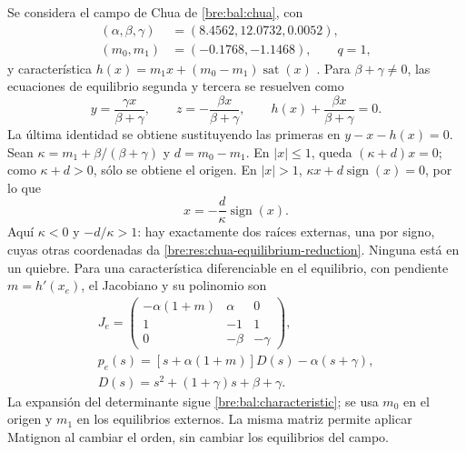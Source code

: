 Se considera el campo de Chua de \eqref{bre:bal:chua}, con
\[
 \begin{aligned}
 (\alpha,\beta,\gamma)&=(8.4562,12.0732,0.0052),\\
 (m_0,m_1)&=(-0.1768,-1.1468),\qquad q=1,
 \end{aligned}
\]
y característica \(h(x)=m_1x+(m_0-m_1)\operatorname{sat}(x)\)
\cite{LeonovKuznetsov2013}. Para \(\beta+\gamma\ne0\), las ecuaciones de
equilibrio segunda y tercera se resuelven como
\begin{equation}
 y=\frac{\gamma x}{\beta+\gamma},\qquad
 z=-\frac{\beta x}{\beta+\gamma},\qquad
 h(x)+\frac{\beta x}{\beta+\gamma}=0.
 \label{bre:res:chua-equilibrium-reduction}
\end{equation}
La última identidad se obtiene sustituyendo las primeras en
\(y-x-h(x)=0\). Sean
\(\kappa=m_1+\beta/(\beta+\gamma)\) y \(d=m_0-m_1\).
En \(|x|\leq1\), queda \((\kappa+d)x=0\); como
\(\kappa+d>0\), sólo se obtiene el origen. En \(|x|>1\),
\(\kappa x+d\operatorname{sign}(x)=0\), por lo que
\[
 x=-\frac d\kappa\operatorname{sign}(x).
\]
Aquí \(\kappa<0\) y \(-d/\kappa>1\): hay exactamente dos raíces externas,
una por signo, cuyas otras coordenadas da
\eqref{bre:res:chua-equilibrium-reduction}. Ninguna está en un quiebre.
Para una característica diferenciable en el equilibrio, con pendiente
\(m=h'(x_e)\), el Jacobiano y su polinomio son
\begin{equation}
 \begin{gathered}
 J_e=\begin{pmatrix}
 -\alpha(1+m)&\alpha&0\\1&-1&1\\0&-\beta&-\gamma
 \end{pmatrix},\\
 p_e(s)=[s+\alpha(1+m)]D(s)-\alpha(s+\gamma),\\
 D(s)=s^2+(1+\gamma)s+\beta+\gamma.
 \end{gathered}
 \label{bre:res:chua-jacobian}
\end{equation}
La expansión del determinante sigue \eqref{bre:bal:characteristic}; se usa
\(m_0\) en el origen y \(m_1\) en los equilibrios externos. La misma
matriz permite aplicar Matignon al cambiar el orden, sin cambiar los
equilibrios del campo.

